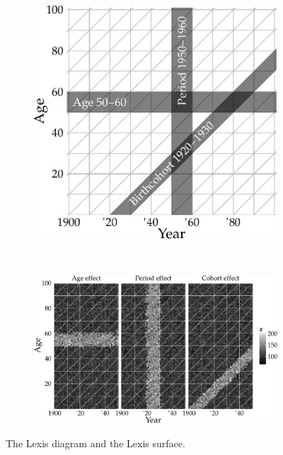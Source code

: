 \documentclass[a4paper, 12pt]{scrartcl}
\begin{document}
\begin{figure}[!htb]
  \begin{subfigure}[t]{0.38\textwidth}
    \includegraphics[width = \linewidth]{../fig/plot-lexis_exmpl.pdf}
    \label{fig:lexis_exmpl}
  \end{subfigure}%
  ~
  \begin{subfigure}[t]{0.62\textwidth}
    \includegraphics[width = \textwidth]{../fig/plot-lexis_fx.pdf}
    \label{fig:lexis_fx}
  \end{subfigure}%
  \caption{The Lexis diagram and the Lexis surface.}
  \label{fig:lexis}
\end{figure}
\end{document}
